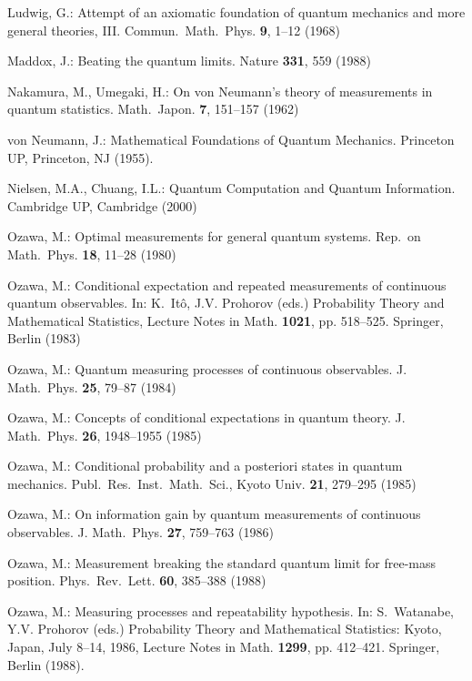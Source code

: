 \documentclass[graybox]{svmult}
\begin{document}
\begin{thebibliography}{10}
Ludwig, G.: Attempt of an axiomatic foundation of quantum mechanics and more
  general theories, {III}.
\newblock Commun.\ Math.\ Phys. \textbf{{9}}, {1--12} (1968)

Maddox, J.: Beating the quantum limits.
\newblock Nature \textbf{{331}}, 559 (1988)

Nakamura, M., Umegaki, H.: On von {Neumann}'s theory of measurements in quantum
  statistics.
\newblock Math.\ Japon. \textbf{{7}}, 151--157 (1962)

von {Neumann}, J.: {Mathematical Foundations of Quantum Mechanics}.
\newblock Princeton UP, Princeton, NJ (1955).

Nielsen, M.A., Chuang, I.L.: Quantum Computation and Quantum Information.
\newblock Cambridge UP, Cambridge (2000)

Ozawa, M.: Optimal measurements for general quantum systems.
\newblock Rep.\ on Math.\ Phys. \textbf{{18}}, 11--28 (1980)

Ozawa, M.: Conditional expectation and repeated measurements of continuous
  quantum observables.
\newblock In: K.~It\^{o}, J.V. Prohorov (eds.) Probability Theory and
  Mathematical Statistics, {\rm Lecture Notes in Math.} {\bf 1021}, pp.
  518--525. Springer, Berlin (1983)

Ozawa, M.: Quantum measuring processes of continuous observables.
\newblock J. Math.\ Phys. \textbf{{25}}, 79--87 (1984)

Ozawa, M.: Concepts of conditional expectations in quantum theory.
\newblock J. Math.\ Phys. \textbf{{26}}, 1948--1955 (1985)

Ozawa, M.: Conditional probability and a posteriori states in quantum
  mechanics.
\newblock Publ.\ Res.\ Inst.\ Math.\ Sci., Kyoto Univ. \textbf{{21}}, 279--295
  (1985)

Ozawa, M.: On information gain by quantum measurements of continuous
  observables.
\newblock J. Math.\ Phys. \textbf{{27}}, 759--763 (1986)

Ozawa, M.: Measurement breaking the standard quantum limit for free-mass
  position.
\newblock Phys.\ Rev.\ Lett. \textbf{{60}}, 385--388 (1988)

Ozawa, M.: Measuring processes and repeatability hypothesis.
\newblock In: S.~Watanabe, Y.V. Prohorov (eds.) Probability Theory and
  Mathematical Statistics: Kyoto, Japan, July 8--14, 1986, Lecture Notes in
  Math. {\bf 1299}, pp. 412--421. Springer, Berlin (1988).


\end{thebibliography}
\end{document}

